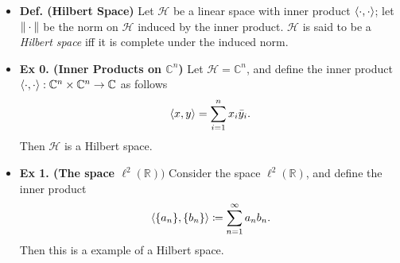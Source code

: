 \documentclass{article}
\begin{document}
\begin{itemize}
\begin{solutions}
\begin{enumerate}[itemsep =-2pt,label = (\arabic{*})]
			\item Let $\lambda \in \mathbb{C}$. Then 
			\begin{align}
				\begin{split}
					\norm{\lambda x} &= \sqrt{\braket{\lambda x, \lambda x}} = \sqrt{\lambda \braket{x, \lambda x}} \\
					&= \sqrt{\lambda \bar{\lambda}\braket{x,x}} \\
					&= |\lambda|\sqrt{\braket{x,x}} = |\lambda|\norm{x}. 
				\end{split}
			\end{align}
			\item Now, we will prove that $\norm{\empspace}$ satisfies the triangle inequality. Let $x, y \in \mathscr{H}$. Then 
			\begin{align}
				\begin{split}
					\norm{x + y}^{2} &= \braket{x + y, x + y} = \braket{x, x + y} + \braket{y, x + y} \\
					&= \overline{\braket{x, x} + \braket{y,x}} + \overline{\braket{x, y} + \braket{y,y}} \\
					&= (\norm{x}^{2} + \norm{y}^{2}) + 2\mathfrak{R}\braket{x,y} \\
					&\leq (\norm{x}^{2} + \norm{y}^{2}) + 2\norm{x}\norm{y} \qquad (\text{by Cauchy-Schwarz}) \\
					&= (\norm{x} + \norm{y})^{2}. 
				\end{split}
			\end{align}
			Taking the square root concludes the proof. 
		\end{enumerate}
	\end{solutions} 	
	\item \textbf{Def. (Hilbert Space)} Let $\mathscr{H}$ be a linear space with inner product $\braket{\cdot,\cdot}$; let $\norm{\empspace}$ be the norm on $\mathscr{H}$ induced by the inner product. $\mathscr{H}$ is said to be a \textit{Hilbert space} iff it is complete under the induced norm. 
	\item \textbf{Ex 0. (Inner Products on $\mathbb{C}^{n}$)} Let $\mathscr{H} = \mathbb{C}^{n}$, and define the inner product $\braket{\cdot,\cdot}: \mathbb{C}^{n} \times \mathbb{C}^{n} \to \mathbb{C}$ as follows 
	\begin{equation}
		\braket{x,y} = \sum_{i = 1}^{n}x_{i}\bar{y}_{i}. 
	\end{equation} 
	Then $\mathscr{H}$ is a Hilbert space. 
	\item \textbf{Ex 1. (The space $\ell^{2}(\mathbb{R}))$} Consider the space $\ell^{2}(\mathbb{R})$, and define the inner product
	\begin{equation}
		\braket{\{a_{n}\}, \{b_{n}\}} \coloneqq \sum_{n = 1}^{\infty}a_{n}b_{n}. 
	\end{equation}
	Then this is a example of a Hilbert space. 
\end{itemize}
\newpage 
\end{document}
